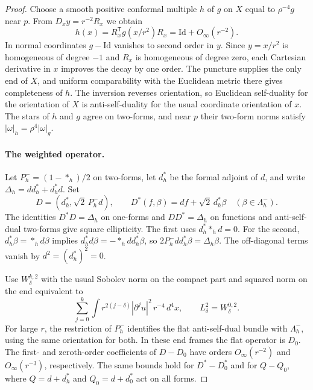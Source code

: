 \documentclass[11pt,letterpaper]{article}
\numberwithin{equation}{section}
\begin{document}
\begin{proof}
Choose a smooth positive conformal multiple \(h\) of \(g\) on \(X\)
equal to \(\rho^{-4}g\) near \(p\). From \(D_xy=r^{-2}R_x\) we obtain
\[
 h(x)=R_x^{\mathsf T}g(x/r^2)R_x=\mathrm{Id}+O_\infty(r^{-2}).
\]
In normal coordinates \(g-\mathrm{Id}\) vanishes to second order
in \(y\). Since \(y=x/r^2\) is homogeneous of degree \(-1\) and \(R_x\)
is homogeneous of degree zero, each Cartesian derivative in \(x\)
improves the decay by one order. The puncture supplies the only end of
\(X\), and uniform comparability with the Euclidean metric there gives
completeness of \(h\). The inversion reverses orientation, so
Euclidean self-duality for the orientation of \(X\) is anti-self-duality
for the usual coordinate orientation of \(x\). The stars of \(h\) and
\(g\) agree on two-forms, and near \(p\) their two-form norms satisfy
\(|\omega|_h=\rho^4|\omega|_g\).

\paragraph{The weighted operator.}
Let \(P_h^-=(1-*_h)/2\) on two-forms, let \(d_h^*\) be the formal
adjoint of \(d\), and write \(\Delta_h=dd_h^*+d_h^*d\). Set
\[
 D=(d_h^*,\sqrt{2}\,P_h^-d),\qquad
 D^*(f,\beta)=df+\sqrt{2}\,d_h^*\beta
 \quad(\beta\in\Lambda_h^-).
\]
The identities \(D^*D=\Delta_h\) on one-forms and
\(DD^*=\Delta_h\) on functions and anti-self-dual two-forms give
square ellipticity. The first uses \(d_h^**_hd=0\). For the second,
\(d_h^*\beta=*_h d\beta\) implies
\(d_h^*d\beta=-*_h dd_h^*\beta\), so
\(2P_h^-dd_h^*\beta=\Delta_h\beta\). The off-diagonal terms vanish
by \(d^2=(d_h^*)^2=0\).

Use \(W^{k,2}_\delta\) with the usual Sobolev norm on the compact part
and squared norm on the end equivalent to
\[
 \sum_{j=0}^k\int r^{2(j-\delta)}|\partial^j u|^2\,r^{-4}\,d^4x,
 \qquad L^2_\delta=W^{0,2}_\delta.
\]
For large \(r\), the restriction of \(P_h^-\) identifies the flat
anti-self-dual bundle with \(\Lambda_h^-\), using the same orientation
for both. In these end frames the flat operator is \(D_0\).
The first- and zeroth-order coefficients of \(D-D_0\) have orders
\(O_\infty(r^{-2})\) and \(O_\infty(r^{-3})\), respectively.
The same bounds hold for \(D^*-D_0^*\) and for
\(Q-Q_0\), where \(Q=d+d_h^*\) and \(Q_0=d+d_0^*\) act on all forms.


\end{proof}
\end{document}
